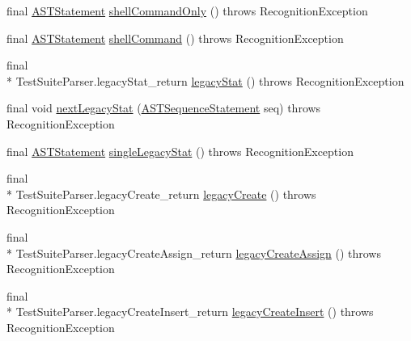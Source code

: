 \begin{DoxyCompactItemize}
\item 
final \hyperlink{classorg_1_1tzi_1_1use_1_1parser_1_1soil_1_1ast_1_1_a_s_t_statement}{A\-S\-T\-Statement} \hyperlink{classorg_1_1tzi_1_1use_1_1parser_1_1testsuite_1_1_test_suite_parser_a8bbd0263ded377ba71ed1ca6361a56a7}{shell\-Command\-Only} ()  throws Recognition\-Exception 
\item 
final \hyperlink{classorg_1_1tzi_1_1use_1_1parser_1_1soil_1_1ast_1_1_a_s_t_statement}{A\-S\-T\-Statement} \hyperlink{classorg_1_1tzi_1_1use_1_1parser_1_1testsuite_1_1_test_suite_parser_a7a131e93bcd08fc6184dda34bdc16c38}{shell\-Command} ()  throws Recognition\-Exception 
\item 
final \\*
Test\-Suite\-Parser.\-legacy\-Stat\-\_\-return \hyperlink{classorg_1_1tzi_1_1use_1_1parser_1_1testsuite_1_1_test_suite_parser_a30982902dfe6bc6ba967f2af21254ab2}{legacy\-Stat} ()  throws Recognition\-Exception 
\item 
final void \hyperlink{classorg_1_1tzi_1_1use_1_1parser_1_1testsuite_1_1_test_suite_parser_af95d694ecdd17552156c6fbf7bb0e5a0}{next\-Legacy\-Stat} (\hyperlink{classorg_1_1tzi_1_1use_1_1parser_1_1soil_1_1ast_1_1_a_s_t_sequence_statement}{A\-S\-T\-Sequence\-Statement} seq)  throws Recognition\-Exception 
\item 
final \hyperlink{classorg_1_1tzi_1_1use_1_1parser_1_1soil_1_1ast_1_1_a_s_t_statement}{A\-S\-T\-Statement} \hyperlink{classorg_1_1tzi_1_1use_1_1parser_1_1testsuite_1_1_test_suite_parser_ab636ccb7349bf99144acb0896d1de3b7}{single\-Legacy\-Stat} ()  throws Recognition\-Exception 
\item 
final \\*
Test\-Suite\-Parser.\-legacy\-Create\-\_\-return \hyperlink{classorg_1_1tzi_1_1use_1_1parser_1_1testsuite_1_1_test_suite_parser_a9e2fd48cefd402d780e01951bcd2e4ac}{legacy\-Create} ()  throws Recognition\-Exception 
\item 
final \\*
Test\-Suite\-Parser.\-legacy\-Create\-Assign\-\_\-return \hyperlink{classorg_1_1tzi_1_1use_1_1parser_1_1testsuite_1_1_test_suite_parser_a0f49c8f06f3424410225ec6b5dec6c78}{legacy\-Create\-Assign} ()  throws Recognition\-Exception 
\item 
final \\*
Test\-Suite\-Parser.\-legacy\-Create\-Insert\-\_\-return \hyperlink{classorg_1_1tzi_1_1use_1_1parser_1_1testsuite_1_1_test_suite_parser_a9f07164a21794de4b42cbe66a093316f}{legacy\-Create\-Insert} ()  throws Recognition\-Exception 
\item 

\end{DoxyCompactItemize}
